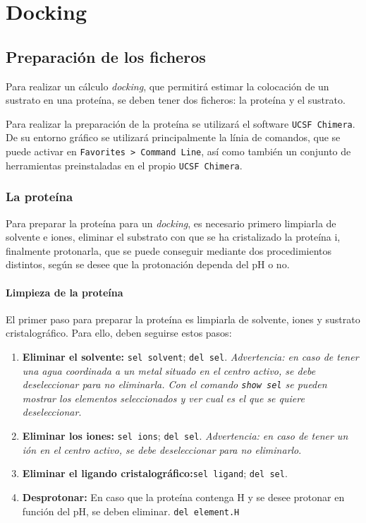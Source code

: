 \chapter{Docking}
\newpage


\section{Preparación de los ficheros}
Para realizar un cálculo \textit{docking}, que permitirá estimar la colocación de un sustrato en una proteína, se deben tener dos ficheros: la proteína y el sustrato.\par
Para realizar la preparación de la proteína se utilizará el software \texttt{UCSF Chimera}. De su entorno gráfico se utilizará principalmente la línia de comandos, que se puede activar en \texttt{Favorites >\ Command Line}, así como también un conjunto de herramientas preinstaladas en el propio \texttt{UCSF Chimera}.

\subsection{La proteína}\label{preparacion_proteina}
	Para preparar la proteína para un \textit{docking}, es necesario primero limpiarla de solvente e iones, eliminar el substrato con que se ha cristalizado la proteína i, finalmente protonarla, que se puede conseguir mediante dos procedimientos distintos, según se desee que la protonación dependa del pH o no.
	
	\subsubsection{Limpieza de la proteína}
		El primer paso para preparar la proteína es limpiarla de solvente, iones y sustrato cristalográfico. Para ello, deben seguirse estos pasos:
		\begin{enumerate}
			\item \textbf{Eliminar el solvente:} \texttt{sel solvent}; \texttt{del sel}. \emph{Advertencia: en caso de tener una agua coordinada a un metal situado en el centro activo, se debe deseleccionar para no eliminarla. Con el comando \texttt{show sel} se pueden mostrar los elementos seleccionados y ver cual es el que se quiere deseleccionar}.
			\item \textbf{Eliminar los iones:} \texttt{sel ions}; \texttt{del sel}. \emph{Advertencia: en caso de tener un ión en el centro activo, se debe deseleccionar para no eliminarlo}.
			\item \textbf{Eliminar el ligando cristalográfico:}\texttt{sel ligand}; \texttt{del sel}.
			\item \textbf{Desprotonar:} En caso que la proteína contenga H y se desee protonar en función del pH, se deben eliminar. \texttt{del element.H}
		\end{enumerate}
	
